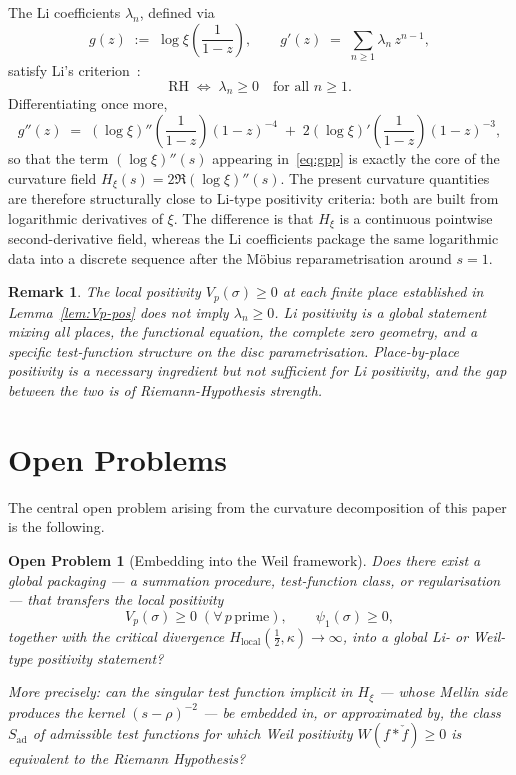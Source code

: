 \documentclass[11pt]{article}
\newtheorem*{remark}{Remark}
\newtheorem{openproblem}[theorem]{Open Problem}
\newcommand{\Hxi}{H_{\xi}}
\newcommand{\Hlocal}{H_{\mathrm{local}}}
\newcommand{\Sad}{S_{\mathrm{ad}}}
\begin{document}
The Li coefficients $\lambda_n$, defined via
\[
g(z)\;:=\;\log\xi\!\left(\frac{1}{1-z}\right),
\qquad
g'(z)\;=\;\sum_{n\ge 1}\lambda_n\,z^{n-1},
\]
satisfy Li's criterion~\cite{Li}:
\[
\mathrm{RH}\;\Longleftrightarrow\;
\lambda_n\ge 0\quad\text{for all }n\ge 1.
\]
Differentiating once more,
\begin{equation}\label{eq:gpp}
g''(z)\;=\;(\log\xi)''\!\left(\frac{1}{1-z}\right)(1-z)^{-4}
\;+\;2(\log\xi)'\!\left(\frac{1}{1-z}\right)(1-z)^{-3},
\end{equation}
so that the term $(\log\xi)''(s)$ appearing in~\eqref{eq:gpp}
is exactly the core of the curvature field
$\Hxi(s)=2\Re(\log\xi)''(s)$.
The present curvature quantities are therefore structurally
close to Li-type positivity criteria: both are built from
logarithmic derivatives of $\xi$.
The difference is that $\Hxi$ is a continuous pointwise
second-derivative field, whereas the Li coefficients package
the same logarithmic data into a discrete sequence after the
M\"obius reparametrisation around $s=1$.

\begin{remark}
The local positivity $V_p(\sigma)\ge 0$ at each finite place
established in Lemma~\ref{lem:Vp-pos} does \emph{not} imply
$\lambda_n\ge 0$.
Li positivity is a global statement mixing all places, the
functional equation, the complete zero geometry, and a
specific test-function structure on the disc parametrisation.
Place-by-place positivity is a necessary ingredient but not
sufficient for Li positivity, and the gap between the two is
of Riemann-Hypothesis strength.
\end{remark}

\section{Open Problems}
\label{sec:open}

The central open problem arising from the curvature
decomposition of this paper is the following.

\begin{openproblem}[Embedding into the Weil framework]\label{op:weil-embedding}
Does there exist a global packaging --- a summation
procedure, test-function class, or regularisation --- that
transfers the local positivity
\[
V_p(\sigma)\ge 0\;(\forall\,p\,\text{prime}),
\qquad
\psi_1(\sigma)\ge 0,
\]
together with the critical divergence
$\Hlocal(\tfrac12,\kappa)\to\infty$, into a global
Li- or Weil-type positivity statement?

More precisely: can the singular test function implicit in
$\Hxi$ --- whose Mellin side produces the kernel
$(s-\rho)^{-2}$ --- be embedded in, or approximated by, the
class $\Sad$ of admissible test functions for which Weil
positivity $W(f*\check f)\ge 0$ is equivalent to the Riemann
Hypothesis?
\end{openproblem}
\end{document}
